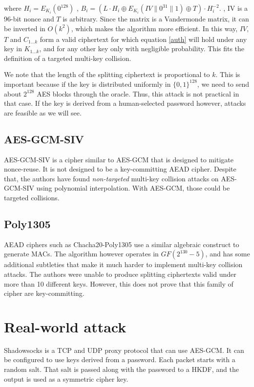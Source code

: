 \documentclass[9pt, a4paper]{article}
\begin{document}
where
$H_i = E_{K_i}(0^{128})$
,
$B_i = (L \cdot H_i \oplus E_{K_i}(IV \parallel 0^{31} \parallel 1) \oplus T) \cdot H_i^{-2}$.
,
IV is a 96-bit nonce
and
$T$ is arbitrary.
Since the matrix is a Vandermonde matrix, it can be inverted in $O(k^2)$, which makes the algorithm more efficient.
In this way, $IV$, $T$ and $C_{1...k}$ form a valid ciphertext for which equation \ref{auth} will hold under any key in $K_{1...k}$, and for any other key only with negligible probability.
This fits the definition of a targeted multi-key collision.

We note that the length of the splitting ciphertext is proportional to $k$.
This is important because
if the key is distributed uniformly in $\{0,1\}^{128}$,
we need to send about $2^{128}$ AES blocks through the oracle.
Thus, this attack is not practical in that case.
If the key is derived from a human-selected password however,
attacks are feasible as we will see.

\subsection{AES-GCM-SIV}
AES-GCM-SIV is a cipher similar to AES-GCM that is designed to mitigate nonce-reuse.
It is not designed to be a key-committing AEAD cipher.
Despite that, the authors have found \emph{non-targeted} multi-key collision attacks on AES-GCM-SIV
using polynomial interpolation. With AES-GCM, those could be targeted collisions.

\subsection{Poly1305}
AEAD ciphers such as Chacha20-Poly1305 use a similar algebraic construct to generate MACs.
The algorithm however operates in $GF(2^{130}-5)$, and has some additional subtleties that make it much harder to implement multi-key collision attacks.
The authors were unable to produce splitting ciphertexts valid under more than 10 different keys. However, this does not prove that this family of cipher are key-committing.

\section{Real-world attack}
Shadowsocks\cite{shadowsocks} is a TCP and UDP proxy protocol that can use AES-GCM.
It can be configured to use keys derived from a password.
Each packet starts with a random salt.
That salt is passed along with the password to a HKDF,
and the output is used as a symmetric cipher key.
\end{document}
